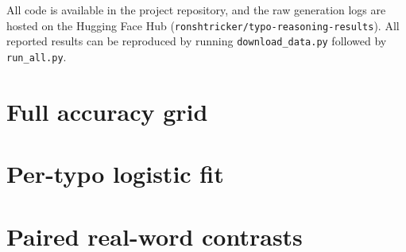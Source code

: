 \documentclass[11pt]{article}
\begin{document}
All code is available in the project repository, and the raw generation logs are
hosted on the Hugging Face Hub (\texttt{ronshtricker/\allowbreak typo-reasoning-results}).
All reported results can be reproduced by running \texttt{download\_data.py}
followed by \texttt{run\_all.py}.



\clearpage
\onecolumn
\appendix

\section{Full accuracy grid}
\label{app:grid}
\begin{table}[!ht]
\centering\scriptsize\setlength{\tabcolsep}{2.6pt}

\caption{Every configuration on every dataset. \emph{acc} is answered-only
accuracy (\%), $n_a$ the number of questions that produced a final answer,
\emph{tok} the mean generated tokens. r$\to$w and w$\to$r are paired
right-to-wrong and wrong-to-right flips against the clean condition over jointly
answered questions, with the continuity-corrected McNemar $p$-value
(uncorrected for multiple comparisons).}
\label{tab:grid}
\end{table}

\section{Per-typo logistic fit}
\label{app:logit}
\begin{table}[!ht]
\centering\small

\caption{Per-typo logistic fit behind \S\ref{sec:realword}. One regression per
dataset, $\text{correct} \sim \text{num\_real} + \text{num\_nonword}$, fitted
over all answered typo traces pooled across the nine configurations. The
predictors are the counts of each kind of typo actually applied to that
question. An odds multiplier is $\exp(\text{coefficient})$: the factor by which
one additional typo of that kind multiplies the odds of a correct answer.}
\label{tab:realword-logit}
\end{table}

\section{Paired real-word contrasts}
\label{app:paired}
\begin{table}[!ht]
\centering\small

\caption{Controlled paired contrast behind \S\ref{sec:realword}, at every typo
rate and every pair of real-word ratios. Within a fixed $r$ the same words of
the same questions are corrupted in the same positions, so only the \emph{kind}
of corruption changes. $\Delta$acc is the accuracy of the higher-$\rho$ variant
minus the lower, over questions answered in both; \emph{r/w} is right-to-wrong
against wrong-to-right flips; $p$ is a continuity-corrected McNemar test and
$^{*}$ marks $p<0.05$ before multiple-comparison correction.}
\label{tab:realword-paired}
\end{table}
\end{document}
